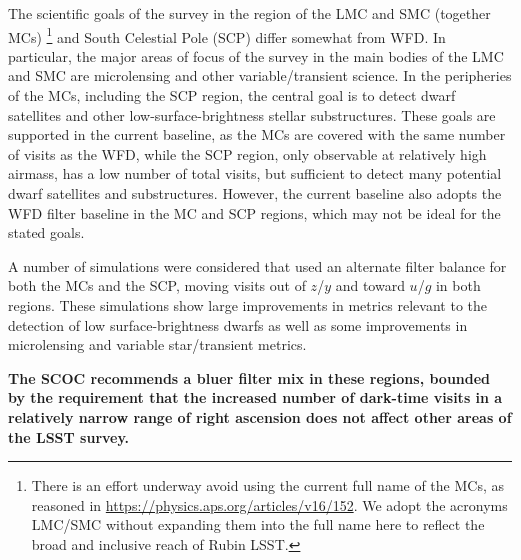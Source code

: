 The scientific goals of the survey in the region of the LMC and SMC (together MCs) \footnote{There is an effort underway avoid using the current full name of the MCs, as reasoned in \url{https://physics.aps.org/articles/v16/152}.  We adopt the acronyms LMC/SMC without expanding them into the full name here to reflect the broad and inclusive reach of Rubin LSST.} 
and South Celestial Pole (SCP) differ somewhat from WFD. In particular, the major areas of focus of the survey in the main bodies of the LMC and SMC are microlensing and other variable/transient science. In the peripheries of the MCs, including the SCP region, the central goal is to detect dwarf satellites and other low-surface-brightness stellar substructures.
These goals are supported in the current baseline, as the MCs are covered with the same number of visits as the WFD, while the SCP region, only observable at relatively high airmass, has a low number of total visits, but sufficient to detect many potential dwarf satellites and substructures. However, the current baseline also adopts the WFD filter baseline in the MC and SCP regions, which may not be ideal for the stated goals.


A number of simulations were considered that used an alternate filter balance for both the MCs and the SCP, moving visits out of $z$/$y$ and toward $u$/$g$ in both regions. These simulations show large improvements in metrics relevant to the detection of low surface-brightness dwarfs as well as some improvements in microlensing and variable star/transient metrics. 

{\bf The SCOC recommends a bluer filter mix in these regions, bounded by the requirement that the increased number of dark-time visits in a relatively narrow range of right ascension does not affect other areas of the LSST survey.} 

